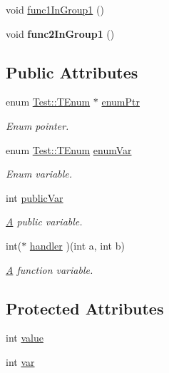 {\bf }\par
\begin{DoxyCompactItemize}
\item 
void \hyperlink{class_test_a63260e6eb6efa149aecf14f86c840c0b}{func1\-In\-Group1} ()
\item 
\hypertarget{class_test_a489fece588ea476e504db5177a157060}{void {\bfseries func2\-In\-Group1} ()}\label{class_test_a489fece588ea476e504db5177a157060}

\end{DoxyCompactItemize}

\subsection*{Public Attributes}
\begin{DoxyCompactItemize}
\item 
enum \hyperlink{class_test_ad8d13fe56b896633273087859b89a1a3}{Test\-::\-T\-Enum} $\ast$ \hyperlink{class_test_a8ee00d5158f7778385133989b5527742}{enum\-Ptr}
\begin{DoxyCompactList}\small\item\em Enum pointer. \end{DoxyCompactList}\item 
enum \hyperlink{class_test_ad8d13fe56b896633273087859b89a1a3}{Test\-::\-T\-Enum} \hyperlink{class_test_a13429658c8d90928b16ec109e32f88b5}{enum\-Var}
\begin{DoxyCompactList}\small\item\em Enum variable. \end{DoxyCompactList}\item 
int \hyperlink{class_test_aba22fd8dcb6ca747e2266fadaf5bc383}{public\-Var}
\begin{DoxyCompactList}\small\item\em \hyperlink{class_a}{A} public variable. \end{DoxyCompactList}\item 
int($\ast$ \hyperlink{class_test_a2ce50e60d16f5071772c6acde08181bd}{handler} )(int a, int b)
\begin{DoxyCompactList}\small\item\em \hyperlink{class_a}{A} function variable. \end{DoxyCompactList}\end{DoxyCompactItemize}
\subsection*{Protected Attributes}
\begin{DoxyCompactItemize}
\item 
int \hyperlink{class_test_aefcbb7ead19f2c28a71a3a3f26cef6cb}{value}
\item 
int \hyperlink{class_test_ae75d55c8cf6390227d51c0965a4de296}{var}
\end{DoxyCompactItemize}
